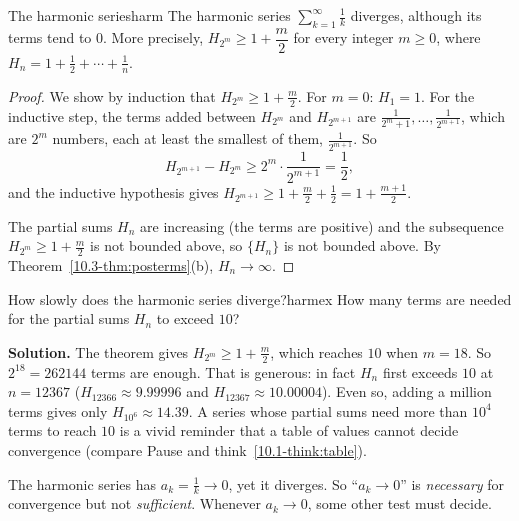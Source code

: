 \documentclass[11pt]{article}
\begin{document}
\begin{thm}{The harmonic series}{harm}
The harmonic series $\displaystyle\sum_{k=1}^\infty\frac1k$ diverges, although its terms tend to $0$. More precisely, $H_{2^m}\ge1+\dfrac m2$ for every integer $m\ge0$, where $H_n=1+\frac12+\cdots+\frac1n$.
\end{thm}
\begin{proof}
We show by induction that $H_{2^m}\ge1+\frac m2$. For $m=0$: $H_1=1$. For the inductive step, the terms added between $H_{2^m}$ and $H_{2^{m+1}}$ are $\frac1{2^m+1},\dots,\frac1{2^{m+1}}$, which are $2^m$ numbers, each at least the smallest of them, $\frac1{2^{m+1}}$. So
\[
H_{2^{m+1}}-H_{2^m}\ge2^m\cdot\frac1{2^{m+1}}=\frac12 ,
\]
and the inductive hypothesis gives $H_{2^{m+1}}\ge1+\frac m2+\frac12=1+\frac{m+1}2$.

The partial sums $H_n$ are increasing (the terms are positive) and the subsequence $H_{2^m}\ge1+\frac m2$ is not bounded above, so $\{H_n\}$ is not bounded above. By Theorem~\ref{10.3-thm:posterms}(b), $H_n\to\infty$.
\end{proof}

\begin{exmp}{How slowly does the harmonic series diverge?}{harmex}
How many terms are needed for the partial sums $H_n$ to exceed $10$?

\textbf{Solution.} The theorem gives $H_{2^m}\ge1+\frac m2$, which reaches $10$ when $m=18$. So $2^{18}=262144$ terms are enough. That is generous: in fact $H_n$ first exceeds $10$ at $n=12367$ ($H_{12366}\approx9.99996$ and $H_{12367}\approx10.00004$). Even so, adding a million terms gives only $H_{10^6}\approx14.39$.
A series whose partial sums need more than $10^{4}$ terms to reach $10$ is a vivid reminder that a table of values cannot decide convergence (compare Pause and think~\ref{10.1-think:table}).
\end{exmp}

\begin{warn}
The harmonic series has $a_k=\frac1k\to0$, yet it diverges. So ``$a_k\to0$'' is \emph{necessary} for convergence but not \emph{sufficient}. Whenever $a_k\to0$, some other test must decide.
\end{warn}
\end{document}
